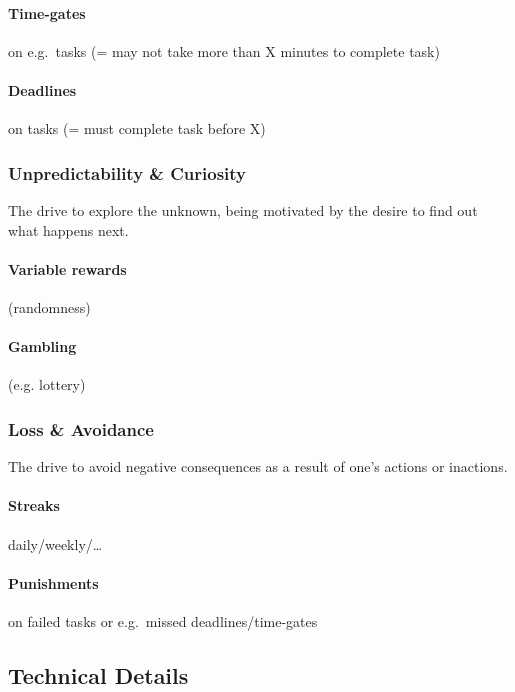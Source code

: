 \documentclass[runningheads]{llncs}
\begin{document}
\paragraph{Time-gates} on e.g.~tasks (= may not take more than X minutes to complete task)~\cite{Yongw15, DeDKN11}

\paragraph{Deadlines} on tasks (= must complete task before X)~\cite{Yongw15}

\subsubsection{Unpredictability \& Curiosity\label{sec:unpredictability-and-curiosity}}\cite{Chou15} The drive to explore the unknown, being motivated by the desire to find out what happens next.

\paragraph{Variable rewards} (randomness)

\paragraph{Gambling} (e.g. lottery)~\cite{Yongw15}

\subsubsection{Loss \& Avoidance\label{sec:loss-and-avoidance}}\cite{Chou15} The drive to avoid negative consequences as a result of one's actions or inactions.

\paragraph{Streaks} daily/weekly/\ldots

\paragraph{Punishments} on failed tasks or e.g.~missed deadlines/time-gates

\subsection{Technical Details}
\end{document}
